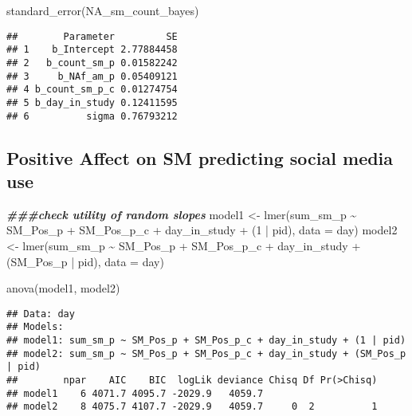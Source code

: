 \documentclass[
]{article}
\newenvironment{Shaded}{\begin{snugshade}}{\end{snugshade}}
\newcommand{\AttributeTok}[1]{\textcolor[rgb]{0.77,0.63,0.00}{#1}}
\newcommand{\DecValTok}[1]{\textcolor[rgb]{0.00,0.00,0.81}{#1}}
\newcommand{\DocumentationTok}[1]{\textcolor[rgb]{0.56,0.35,0.01}{\textbf{\textit{#1}}}}
\newcommand{\FunctionTok}[1]{\textcolor[rgb]{0.00,0.00,0.00}{#1}}
\newcommand{\NormalTok}[1]{#1}
\newcommand{\OtherTok}[1]{\textcolor[rgb]{0.56,0.35,0.01}{#1}}
\newcommand{\SpecialCharTok}[1]{\textcolor[rgb]{0.00,0.00,0.00}{#1}}
\begin{document}
\begin{Shaded}
\begin{Highlighting}[]
\FunctionTok{standard\_error}\NormalTok{(NA\_sm\_count\_bayes)}
\end{Highlighting}
\end{Shaded}

\begin{verbatim}
##        Parameter         SE
## 1    b_Intercept 2.77884458
## 2   b_count_sm_p 0.01582242
## 3     b_NAf_am_p 0.05409121
## 4 b_count_sm_p_c 0.01274754
## 5 b_day_in_study 0.12411595
## 6          sigma 0.76793212
\end{verbatim}

\hypertarget{positive-affect-on-sm-predicting-social-media-use}{%
\subsection{Positive Affect on SM predicting social media
use}\label{positive-affect-on-sm-predicting-social-media-use}}

\begin{Shaded}
\begin{Highlighting}[]
\DocumentationTok{\#\#\#check utility of random slopes}
\NormalTok{model1 }\OtherTok{\textless{}{-}} \FunctionTok{lmer}\NormalTok{(sum\_sm\_p }\SpecialCharTok{\textasciitilde{}}\NormalTok{ SM\_Pos\_p }\SpecialCharTok{+}\NormalTok{ SM\_Pos\_p\_c }\SpecialCharTok{+}\NormalTok{ day\_in\_study }\SpecialCharTok{+}\NormalTok{ (}\DecValTok{1} \SpecialCharTok{|}\NormalTok{ pid), }\AttributeTok{data =}\NormalTok{ day)}
\NormalTok{model2 }\OtherTok{\textless{}{-}} \FunctionTok{lmer}\NormalTok{(sum\_sm\_p }\SpecialCharTok{\textasciitilde{}}\NormalTok{ SM\_Pos\_p }\SpecialCharTok{+}\NormalTok{ SM\_Pos\_p\_c }\SpecialCharTok{+}\NormalTok{ day\_in\_study }\SpecialCharTok{+}\NormalTok{ (SM\_Pos\_p }\SpecialCharTok{|}\NormalTok{ pid), }\AttributeTok{data =}\NormalTok{ day)}

\FunctionTok{anova}\NormalTok{(model1, model2)}
\end{Highlighting}
\end{Shaded}

\begin{verbatim}
## Data: day
## Models:
## model1: sum_sm_p ~ SM_Pos_p + SM_Pos_p_c + day_in_study + (1 | pid)
## model2: sum_sm_p ~ SM_Pos_p + SM_Pos_p_c + day_in_study + (SM_Pos_p | pid)
##        npar    AIC    BIC  logLik deviance Chisq Df Pr(>Chisq)
## model1    6 4071.7 4095.7 -2029.9   4059.7                    
## model2    8 4075.7 4107.7 -2029.9   4059.7     0  2          1
\end{verbatim}
\end{document}
